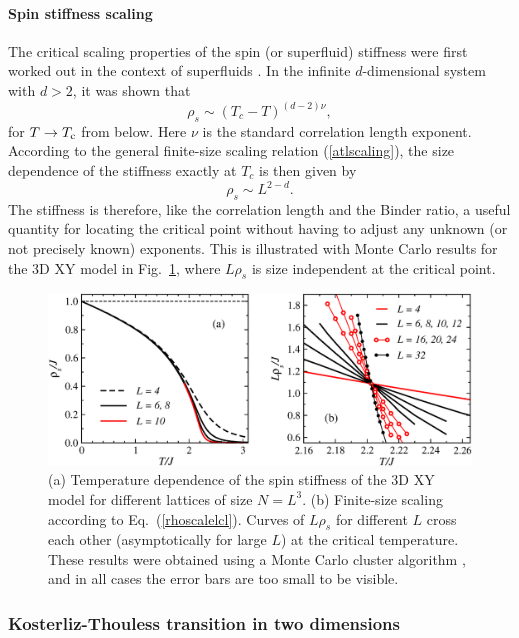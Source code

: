 \documentclass[draft,numberedheadings]{aipproc}
\begin{document}
\paragraph{Spin stiffness scaling}

The critical scaling properties of the spin (or superfluid) stiffness were first worked out in the context of superfluids \cite{fisher73,josephson66}. 
In the infinite $d$-dimensional system with $d>2$, it was shown that 
\begin{equation}
\rho_s \sim (T_c-T)^{(d-2)\nu},
\label{rhoscaletcl}
\end{equation}
 for $T \to T_{\rm c}$ from below. Here $\nu$ is the standard
correlation length exponent. According to the general finite-size scaling relation (\ref{atlscaling}), the size dependence of the stiffness 
exactly at $T_c$ is then given by
\begin{equation}
\rho_s \sim L^{2-d}.
\label{rhoscalelcl}
\end{equation}
The stiffness is therefore, like the correlation length and the Binder ratio, a useful quantity for locating the critical point without
having to adjust any unknown (or not precisely known) exponents. This is illustrated with Monte Carlo results for the 3D XY model in 
Fig.~\ref{wxy3d}, where $L\rho_s$ is size independent at the critical point.

\begin{figure}
\includegraphics[width=12cm, clip]{wxy3d.eps}
\caption{(a) Temperature dependence of the spin stiffness of the 3D XY model for different lattices of size $N=L^3$. (b) Finite-size scaling according
to Eq.~(\ref{rhoscalelcl}). Curves of $L\rho_s$ for different $L$ cross each other (asymptotically for large $L$) at the critical temperature.
These results were obtained using a Monte Carlo cluster algorithm \cite{wolff}, and in all cases the error bars are too small to be visible.}
\label{wxy3d}
\end{figure}

\subsubsection{Kosterliz-Thouless transition in two dimensions}
\end{document}
